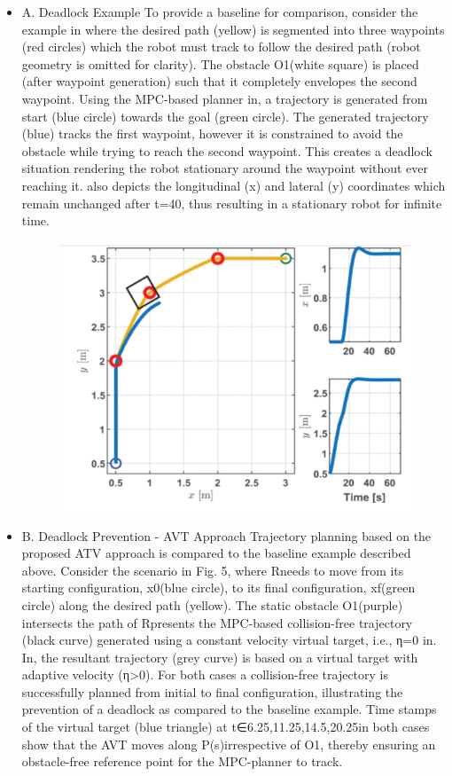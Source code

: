 \documentclass[sigplan,screen]{acmart}
\begin{document}
\begin{itemize}
\item A. Deadlock Example
To provide a baseline for comparison, consider the example in where the desired path (yellow) is segmented into three waypoints (red circles) which the robot must track to follow the desired path (robot geometry is omitted for clarity). The obstacle O1(white square) is placed (after waypoint generation) such that it completely envelopes the second waypoint. Using the MPC-based planner in, a trajectory is generated from start (blue circle) towards the goal (green circle). The generated trajectory (blue) tracks the first waypoint, however it is constrained to avoid the obstacle while trying to reach the second waypoint. This creates a deadlock situation rendering the robot stationary around the waypoint without ever reaching it. also depicts the longitudinal (x) and lateral (y) coordinates which remain unchanged after t=40, thus resulting in a stationary robot for infinite time.
\begin{figure}[h]
    \centering
    \includegraphics[width=\linewidth]{8.png}
\end{figure}
\item B. Deadlock Prevention - AVT Approach
Trajectory planning based on the proposed ATV approach is compared to the baseline example described above. Consider the scenario in Fig. 5, where Rneeds to move from its starting configuration, x0(blue circle), to its final configuration, xf(green circle) along the desired path (yellow). The static obstacle O1(purple) intersects the path of Rpresents the MPC-based collision-free trajectory (black curve) generated using a constant velocity virtual target, i.e., η=0 in. In, the resultant trajectory (grey curve) is based on a virtual target with adaptive velocity (η>0). For both cases a collision-free trajectory is successfully planned from initial to final configuration, illustrating the prevention of a deadlock as compared to the baseline example. Time stamps of the virtual target (blue triangle) at t∈{6.25,11.25,14.5,20.25}in both cases show that the AVT moves along P(s)irrespective of O1, thereby ensuring an obstacle-free reference point for the MPC-planner to track.

\end{itemize}
\end{document}
